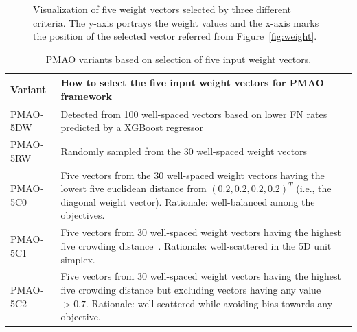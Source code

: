 \documentclass[a4paper,fleqn, review]{cas-dc}
\begin{document}
\begin{figure}[pos=!htbp, align=\centering, width=17cm]
	
	\caption{Visualization of five weight vectors selected by three different criteria. The y-axis portrays the weight values and the x-axis marks the position of the selected vector referred from Figure~\ref{fig:weight}. }
	\label{fig:simple-weight}
\end{figure}

\begin{table}[!htbp]
	\small
	\caption{PMAO variants based on selection of five input weight vectors.}
	\begin{tabular}{l|L{14cm}}
		Variant &  How to select the five input weight vectors for PMAO framework\\
		\hline
		PMAO-5DW  &  Detected from 100 well-spaced vectors based on lower FN rates predicted by a XGBoost regressor\\
		\hline
		PMAO-5RW  &  Randomly sampled from the 30 well-spaced weight vectors \\
		\hline
		PMAO-5C0  &  Five vectors from the 30 well-spaced weight vectors having the lowest five euclidean distance from $(0.2,0.2,0.2,0.2)^T$ (i.e., the diagonal weight vector). Rationale: well-balanced among the objectives. \\
		\hline
		PMAO-5C1  &  Five vectors from 30 well-spaced weight vectors having the highest five crowding distance~\cite{deb2002fast}. Rationale: well-scattered in the 5D unit simplex. \\
		\hline
		PMAO-5C2  &  Five vectors from 30 well-spaced weight vectors having the highest five crowding distance but excluding vectors having any value $> 0.7$. Rationale: well-scattered while avoiding bias towards any objective.\\
	\end{tabular}\label{tab:variants-weight}
\end{table}
\end{document}

